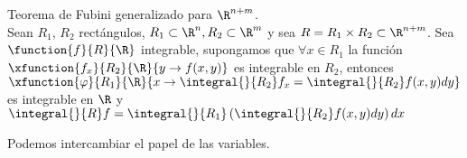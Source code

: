 	\begin{teor} Teorema de Fubini generalizado para $\R^{n+m}$.\\
	Sean $R_1$, $R_2$ rectángulos, $R_1\subset \R^n, R_2\subset \R^m$ y sea $R=R_1\times R_2 \subset\R^{n+m}$. Sea $\function{f}{R}{\R}$ integrable, supongamos que $\forall x\in R_1$ la función $\xfunction{f_x}{R_2}{\R}{y\to f(x,y)}$ es integrable en $R_2$, entonces $\xfunction{\varphi}{R_1}{\R}{x\to\integral{}{R_2} f_x=\integral{}{R_2} f(x,y)dy}$ es integrable en $\R$ y $\integral{}{R} f=\integral{}{R_1}\left(\integral{}{R_2}f(x,y)dy\right)dx$
	\end{teor}
	
	\begin{observacion} Podemos intercambiar el papel de las variables.
	\end{observacion}
	
